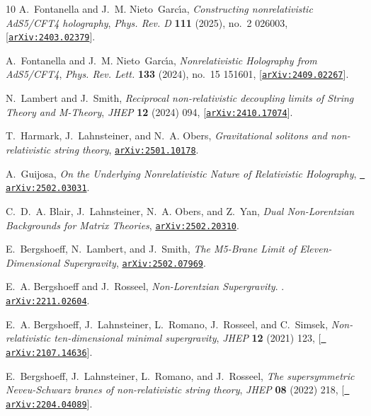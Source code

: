 \documentclass[11pt]{article}
\numberwithin{equation}{section}
\begin{document}
{{\begin{thebibliography}{10}
A.~Fontanella and J.~M. Nieto~Garc\'\i{}a, {\it {Constructing nonrelativistic
  AdS5/CFT4 holography}},  {\em Phys. Rev. D} {\bf 111} (2025), no.~2 026003,
  [\href{http://arxiv.org/abs/2403.02379}{{\tt arXiv:2403.02379}}].

A.~Fontanella and J.~M. Nieto~Garc\'\i{}a, {\it {Nonrelativistic Holography
  from AdS5/CFT4}},  {\em Phys. Rev. Lett.} {\bf 133} (2024), no.~15 151601,
  [\href{http://arxiv.org/abs/2409.02267}{{\tt arXiv:2409.02267}}].

N.~Lambert and J.~Smith, {\it {Reciprocal non-relativistic decoupling limits of
  String Theory and M-Theory}},  {\em JHEP} {\bf 12} (2024) 094,
  [\href{http://arxiv.org/abs/2410.17074}{{\tt arXiv:2410.17074}}].

T.~Harmark, J.~Lahnsteiner, and N.~A. Obers, {\it {Gravitational solitons and
  non-relativistic string theory}},
  \href{http://arxiv.org/abs/2501.10178}{{\tt arXiv:2501.10178}}.

A.~Guijosa, {\it {On the Underlying Nonrelativistic Nature of Relativistic
  Holography}},  \href{http://arxiv.org/abs/2502.03031}{{\tt
  arXiv:2502.03031}}.

C.~D.~A. Blair, J.~Lahnsteiner, N.~A. Obers, and Z.~Yan, {\it {Dual
  Non-Lorentzian Backgrounds for Matrix Theories}},
  \href{http://arxiv.org/abs/2502.20310}{{\tt arXiv:2502.20310}}.

E.~Bergshoeff, N.~Lambert, and J.~Smith, {\it {The M5-Brane Limit of
  Eleven-Dimensional Supergravity}},
  \href{http://arxiv.org/abs/2502.07969}{{\tt arXiv:2502.07969}}.

E.~A. Bergshoeff and J.~Rosseel, {\em {Non-Lorentzian Supergravity}}.
.
\newblock \href{http://arxiv.org/abs/2211.02604}{{\tt arXiv:2211.02604}}.

E.~A. Bergshoeff, J.~Lahnsteiner, L.~Romano, J.~Rosseel, and C.~Simsek, {\it
  {Non-relativistic ten-dimensional minimal supergravity}},  {\em JHEP} {\bf
  12} (2021) 123, [\href{http://arxiv.org/abs/2107.14636}{{\tt
  arXiv:2107.14636}}].

E.~Bergshoeff, J.~Lahnsteiner, L.~Romano, and J.~Rosseel, {\it {The
  supersymmetric Neveu-Schwarz branes of non-relativistic string theory}},
  {\em JHEP} {\bf 08} (2022) 218, [\href{http://arxiv.org/abs/2204.04089}{{\tt
  arXiv:2204.04089}}].


\end{thebibliography}}}
\end{document}
